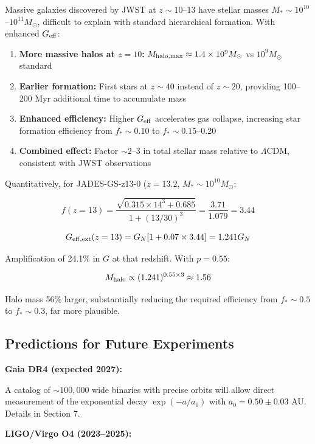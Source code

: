 \documentclass[10pt,a4paper]{article}
\providecommand{\tightlist}{\setlength{\itemsep}{0pt}\setlength{\parskip}{0pt}}
\begin{document}
Massive galaxies discovered by JWST at \(z \sim 10\)--13 have stellar
masses \(M_* \sim 10^{10}\)--\(10^{11} M_\odot\), difficult to explain
with standard hierarchical formation. With enhanced \(G_{\rm eff}\):

\begin{enumerate}
\def\labelenumi{\arabic{enumi}.}
\tightlist
\item
  \textbf{More massive halos at \(z=10\):}
  \(M_{\rm halo,max} \approx 1.4 \times 10^9 M_\odot\) vs
  \(10^9 M_\odot\) standard
\item
  \textbf{Earlier formation:} First stars at \(z \sim 40\) instead of
  \(z \sim 20\), providing 100--200 Myr additional time to accumulate
  mass
\item
  \textbf{Enhanced efficiency:} Higher \(G_{\rm eff}\) accelerates gas
  collapse, increasing star formation efficiency from \(f_* \sim 0.10\)
  to \(f_* \sim 0.15\)--0.20
\item
  \textbf{Combined effect:} Factor \(\sim 2\)--3 in total stellar mass
  relative to \(\Lambda\)CDM, consistent with JWST observations
\end{enumerate}

Quantitatively, for JADES-GS-z13-0 (\(z=13.2\),
\(M_* \sim 10^{10} M_\odot\):

\[f(z=13) = \frac{\sqrt{0.315 \times 14^3 + 0.685}}{1+(13/30)^3} = \frac{3.71}{1.079} = 3.44\]

\[G_{\rm eff,ext}(z=13) = G_N[1 + 0.07 \times 3.44] = 1.241 G_N\]

Amplification of 24.1\% in \(G\) at that redshift. With \(p = 0.55\):

\[M_{\rm halo} \propto (1.241)^{0.55 \times 3} \approx 1.56\]

Halo mass 56\% larger, substantially reducing the required efficiency
from \(f_* \sim 0.5\) to \(f_* \sim 0.3\), far more plausible.

\subsection{Predictions for Future
Experiments}\label{predictions-for-future-experiments}

\textbf{Gaia DR4 (expected 2027):}

A catalog of \(\sim 100,000\) wide binaries with precise orbits will
allow direct measurement of the exponential decay \(\exp(-a/a_0)\) with
\(a_0 = 0.50 \pm 0.03\) AU. Details in Section 7.

\textbf{LIGO/Virgo O4 (2023--2025):}
\end{document}
